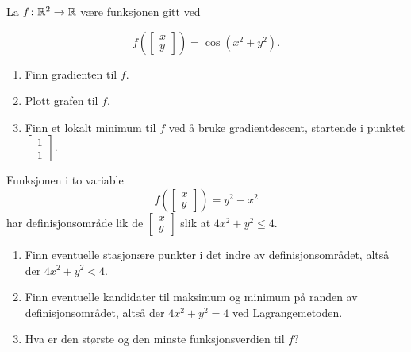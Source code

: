 La $f \colon \mathbb{R}^2 \to \mathbb{R}$ være funksjonen gitt ved

$$f(\begin{bmatrix}x\\y\end{bmatrix}) = \cos(x^2 + y^2).$$

\begin{enumerate}
  \item Finn gradienten til $f$.
  \item Plott grafen til $f$.
  \item Finn et lokalt minimum til $f$ ved å bruke gradientdescent, startende i punktet $\begin{bmatrix}1\\1\end{bmatrix}$.
\end{enumerate}

\begin{oppgave}
  Funksjonen i to variable 
  $$f(\begin{bmatrix}x\\y\end{bmatrix}) = y^2 - x^2$$
  har definisjonsområde lik de $\begin{bmatrix}x\\y\end{bmatrix}$
  slik at $4x^2 + y^2 \le 4$.
  \begin{enumerate}
    \item Finn eventuelle stasjonære punkter i det indre av definisjonsområdet, altså der $4x^2+y^2 < 4$.
    \item Finn eventuelle kandidater til maksimum og minimum på randen av definisjonsområdet, altså der $4x^2 + y^2 = 4$ ved Lagrangemetoden.
    \item Hva er den største og den minste funksjonsverdien til $f$?
  \end{enumerate}
\end{oppgave}
